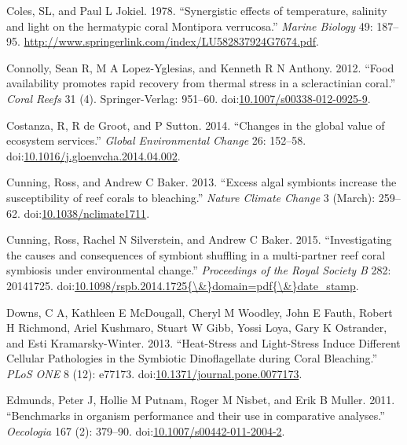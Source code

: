 \documentclass[]{elsarticle} %
\begin{document}
\hypertarget{ref-Coles:1978p1124}{}
Coles, SL, and Paul L Jokiel. 1978. ``Synergistic effects of
temperature, salinity and light on the hermatypic coral Montipora
verrucosa.'' \emph{Marine Biology} 49: 187--95.
\url{http://www.springerlink.com/index/LU582837924G7674.pdf}.

\hypertarget{ref-Connolly:2012ep}{}
Connolly, Sean R, M A Lopez-Yglesias, and Kenneth R N Anthony. 2012.
``Food availability promotes rapid recovery from thermal stress in a
scleractinian coral.'' \emph{Coral Reefs} 31 (4). Springer-Verlag:
951--60.
doi:\href{https://doi.org/10.1007/s00338-012-0925-9}{10.1007/s00338-012-0925-9}.

\hypertarget{ref-Costanza:2014ex}{}
Costanza, R, R de Groot, and P Sutton. 2014. ``Changes in the global
value of ecosystem services.'' \emph{Global Environmental Change} 26:
152--58.
doi:\href{https://doi.org/10.1016/j.gloenvcha.2014.04.002}{10.1016/j.gloenvcha.2014.04.002}.

\hypertarget{ref-Cunning:2013gp}{}
Cunning, Ross, and Andrew C Baker. 2013. ``Excess algal symbionts
increase the susceptibility of reef corals to bleaching.'' \emph{Nature
Climate Change} 3 (March): 259--62.
doi:\href{https://doi.org/10.1038/nclimate1711}{10.1038/nclimate1711}.

\hypertarget{ref-Cunning:2015ja}{}
Cunning, Ross, Rachel N Silverstein, and Andrew C Baker. 2015.
``Investigating the causes and consequences of symbiont shuffling in a
multi-partner reef coral symbiosis under environmental change.''
\emph{Proceedings of the Royal Society B} 282: 20141725.
doi:\href{https://doi.org/10.1098/rspb.2014.1725\%7B/\&\%7Ddomain=pdf\%7B/\&\%7Ddate_stamp}{10.1098/rspb.2014.1725\{\textbackslash{}\&\}domain=pdf\{\textbackslash{}\&\}date\_stamp}.

\hypertarget{ref-Downs:2013kc}{}
Downs, C A, Kathleen E McDougall, Cheryl M Woodley, John E Fauth, Robert
H Richmond, Ariel Kushmaro, Stuart W Gibb, Yossi Loya, Gary K Ostrander,
and Esti Kramarsky-Winter. 2013. ``Heat-Stress and Light-Stress Induce
Different Cellular Pathologies in the Symbiotic Dinoflagellate during
Coral Bleaching.'' \emph{PLoS ONE} 8 (12): e77173.
doi:\href{https://doi.org/10.1371/journal.pone.0077173}{10.1371/journal.pone.0077173}.

\hypertarget{ref-Edmunds:2011bv}{}
Edmunds, Peter J, Hollie M Putnam, Roger M Nisbet, and Erik B Muller.
2011. ``Benchmarks in organism performance and their use in comparative
analyses.'' \emph{Oecologia} 167 (2): 379--90.
doi:\href{https://doi.org/10.1007/s00442-011-2004-2}{10.1007/s00442-011-2004-2}.
\end{document}
